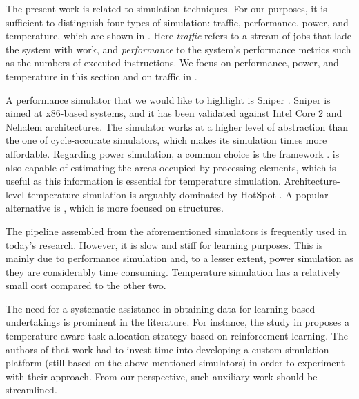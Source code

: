 The present work is related to simulation techniques. For our purposes, it is
sufficient to distinguish four types of simulation: traffic, performance, power,
and temperature, which are shown in . Here \emph{traffic}
refers to a stream of jobs that lade the system with work, and
\emph{performance} to the system's performance metrics such as the numbers of
executed instructions. We focus on performance, power, and temperature in this
section and on traffic in .

A performance simulator that we would like to highlight is Sniper
\cite{carlson2011}. Sniper is aimed at x86-based systems, and it has been
validated against Intel Core 2 and Nehalem architectures. The simulator works at
a higher level of abstraction than the one of cycle-accurate simulators, which
makes its simulation times more affordable. Regarding power simulation, a common
choice is the  framework \cite{li2009}.  is also capable of
estimating the areas occupied by processing elements, which is useful as this
information is essential for temperature simulation. Architecture-level
temperature simulation is arguably dominated by HotSpot \cite{skadron2004}. A
popular alternative is  \cite{sridhar2010}, which is more focused on
 structures.

The pipeline assembled from the aforementioned simulators is frequently used in
today's research. However, it is slow and stiff for learning purposes. This is
mainly due to performance simulation and, to a lesser extent, power simulation
as they are considerably time consuming. Temperature simulation has a relatively
small cost compared to the other two.

The need for a systematic assistance in obtaining data for learning-based
undertakings is prominent in the literature. For instance, the study in
\cite{lu2015} proposes a temperature-aware task-allocation strategy based on
reinforcement learning. The authors of that work had to invest time into
developing a custom simulation platform (still based on the above-mentioned
simulators) in order to experiment with their approach. From our perspective,
such auxiliary work should be streamlined.
